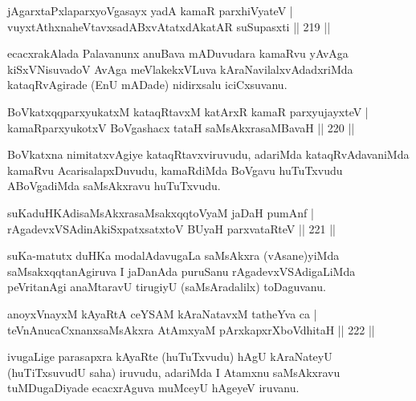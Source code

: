 \begin{shl}
jAgarxtaPxlaparxyoVgasayx yadA kamaR parxhiVyateV |\\
vuyxtAthxnaheVtavxsadABxvAtatxdAkatAR suSupasxti \hfill || 219 ||
\end{shl}

\begin{artha}
ecacxrakAlada Palavanunx anuBava mADuvudara kamaRvu yAvAga kiSxVNisuvadoV AvAga meVlakekxVLuva kAraNavilalxvAdadxriMda kataqRvAgirade (EnU mADade) nidirxsalu iciCxsuvanu.
\end{artha}

\begin{shl}
BoVkatxqqparxyukatxM kataqRtavxM katArxR kamaR parxyujayxteV |\\
kamaRparxyukotxV BoVgashacx tataH saMsAkxrasaMBavaH \hfill || 220 ||
\end{shl}

\begin{artha}
BoVkatxna nimitatxvAgiye kataqRtavxviruvudu, adariMda kataqRvAdavaniMda kamaRvu AcarisalapxDuvudu, kamaRdiMda BoVgavu huTuTxvudu ABoVgadiMda saMsAkxravu huTuTxvudu.
\end{artha}


\begin{shl}
suKaduHKAdisaMsAkxrasaMsakxqqtoV\s yaM jaDaH pumAnf |\\
rAgadevxVSAdinA\s \s kiSxpatxsatxtoV BUyaH parxvataRteV \hfill || 221 ||
\end{shl}

\begin{artha}
suKa-matutx duHKa modalAdavugaLa saMsAkxra (vAsane)yiMda saMsakxqqtanAgiruva I jaDanAda puruSanu rAgadevxVSAdigaLiMda peVritanAgi anaMtaravU tirugiyU (saMsAradalilx) toDaguvanu.
\end{artha}

\begin{shl}
anoyxVnayxM kAyaRtA ceYSAM kAraNatavxM tatheYva ca |\\
teVnAnucaCxnanxsaMsAkxra AtAmx\s yaM pArxkapxrXboVdhitaH \hfill || 222 ||
\end{shl}

\begin{artha}
ivugaLige parasapxra kAyaRte (huTuTxvudu) hAgU kAraNateyU (huTiTxsuvudU saha) iruvudu, adariMda I Atamxnu saMsAkxravu tuMDugaDiyade ecacxrAguva muMceyU hAgeyeV iruvanu.
\end{artha}

